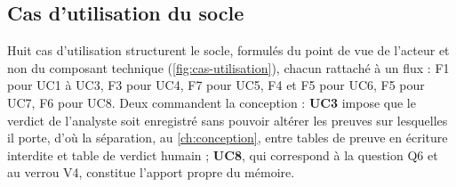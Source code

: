 \subsection{Cas d'utilisation du socle}

Huit cas d'utilisation structurent le socle, formulés du point de vue de l'acteur et non du
composant technique (\cref{fig:cas-utilisation}), chacun rattaché à un flux : F1 pour UC1 à
UC3, F3 pour UC4, F7 pour UC5, F4 et F5 pour UC6, F5 pour UC7, F6 pour UC8. Deux commandent la
conception : \textbf{UC3} impose que le verdict de l'analyste soit enregistré sans pouvoir altérer
les preuves sur lesquelles il porte, d'où la séparation, au \cref{ch:conception}, entre tables de preuve en
écriture interdite et table de verdict humain ; \textbf{UC8}, qui correspond à la question Q6 et au
verrou V4, constitue l'apport propre du mémoire.

